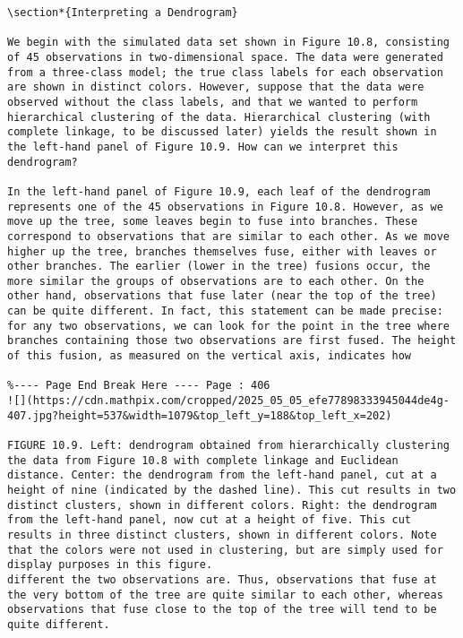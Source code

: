 \documentclass[10pt]{article}
\begin{document}
\begin{verbatim}
\section*{Interpreting a Dendrogram}

We begin with the simulated data set shown in Figure 10.8, consisting of 45 observations in two-dimensional space. The data were generated from a three-class model; the true class labels for each observation are shown in distinct colors. However, suppose that the data were observed without the class labels, and that we wanted to perform hierarchical clustering of the data. Hierarchical clustering (with complete linkage, to be discussed later) yields the result shown in the left-hand panel of Figure 10.9. How can we interpret this dendrogram?

In the left-hand panel of Figure 10.9, each leaf of the dendrogram represents one of the 45 observations in Figure 10.8. However, as we move up the tree, some leaves begin to fuse into branches. These correspond to observations that are similar to each other. As we move higher up the tree, branches themselves fuse, either with leaves or other branches. The earlier (lower in the tree) fusions occur, the more similar the groups of observations are to each other. On the other hand, observations that fuse later (near the top of the tree) can be quite different. In fact, this statement can be made precise: for any two observations, we can look for the point in the tree where branches containing those two observations are first fused. The height of this fusion, as measured on the vertical axis, indicates how

%---- Page End Break Here ---- Page : 406
![](https://cdn.mathpix.com/cropped/2025_05_05_efe77898333945044de4g-407.jpg?height=537&width=1079&top_left_y=188&top_left_x=202)

FIGURE 10.9. Left: dendrogram obtained from hierarchically clustering the data from Figure 10.8 with complete linkage and Euclidean distance. Center: the dendrogram from the left-hand panel, cut at a height of nine (indicated by the dashed line). This cut results in two distinct clusters, shown in different colors. Right: the dendrogram from the left-hand panel, now cut at a height of five. This cut results in three distinct clusters, shown in different colors. Note that the colors were not used in clustering, but are simply used for display purposes in this figure.
different the two observations are. Thus, observations that fuse at the very bottom of the tree are quite similar to each other, whereas observations that fuse close to the top of the tree will tend to be quite different.


\end{verbatim}
\end{document}
